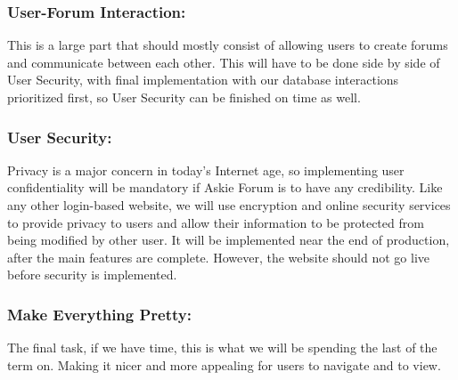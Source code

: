 \documentclass[12pt]{article}
\begin{document}
\subsubsection{User-Forum Interaction:} 
\begin{flushleft} This is a large part that should mostly consist of allowing users to create forums and communicate between each other. This will have to be done side by side of User Security, with final implementation with our database interactions prioritized first, so User Security can be finished on time as well.
\end{flushleft}

\subsubsection{User Security:} 
\begin{flushleft}Privacy is a major concern in today's Internet age, so implementing user confidentiality will be mandatory if Askie Forum is to have any credibility. Like any other login-based website, we will use encryption and online security services to provide privacy to users and allow their information to be protected from being modified by other user. It will be implemented near the end of production, after the main features are complete. However, the website should not go live before security is implemented.
\end{flushleft}
\subsubsection{Make Everything Pretty:} 
\begin{flushleft}   
The final task, if we have time, this is what we will be spending the last of the term on.  Making it nicer and more appealing for users to navigate and to view.
\end{flushleft}
\end{document}
